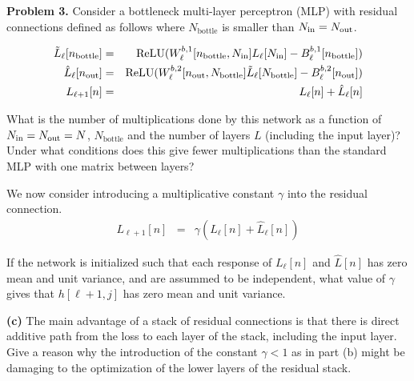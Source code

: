 \documentclass{article}
\newcommand{\solution}[1]{}
\begin{document}
\bigskip
{\bf Problem 3.} Consider a bottleneck multi-layer perceptron (MLP) with residual connections
defined as follows where $N_{\mathrm{bottle}}$ is smaller than $N_{\mathrm{in}} = N_{\mathrm{out}}$.

\begin{eqnarray*}
  \tilde{L}_\ell[n_{\mathrm{bottle}}] & = & \mathrm{ReLU}(W^{b,1}_\ell[n_{\mathrm{bottle}},N_{\mathrm{in}}]L_\ell[N_{\mathrm{in}}] - B^{b,1}_\ell[n_{\mathrm{bottle}}]) \\
  \hat{L}_\ell[n_{\mathrm{out}}] & = & \mathrm{ReLU}(W^{b,2}_\ell[n_{\mathrm{out}},N_{\mathrm{bottle}}]\tilde{L}_\ell[N_{\mathrm{bottle}}] - B^{b,2}_\ell[n_{\mathrm{out}}]) \\
  L_{\ell+1}[n] & = & L_\ell[n] + \hat{L}_\ell[n]
\end{eqnarray*}

 What is the number of multiplications done by this network as a function of $N_{\mathrm{in}}
= N_{\mathrm{out}} = N$, $N_{\mathrm{bottle}}$ and the number of layers $L$ (including the input layer)?  Under
what conditions does this give fewer multiplications than the standard MLP with one matrix between
layers?


\solution{The number of multiplications is $2NN_{\mathrm{bottle}}(L-1)$.  For a standard MLP (with
  no botleneck) the number of multiplications is $N^2(L-1)$.  The bottleneck layer has fewer
  multiplications for $N_{\mathrm{bottle}} < N/2$.}


 We now consider introducing a multiplicative constant $\gamma$ into the residual connection.
\begin{eqnarray*}
  L_{\ell+1}[n] & = & \gamma(L_\ell[n] + \hat{L}_\ell[n])
\end{eqnarray*}

If the network is initialized such that each response of $L_\ell[n]$ and $\hat{L}[n]$ has zero
mean and unit variance, and are assummed to be independent, what value of $\gamma$ gives that
$h[\ell+1,j]$ has zero mean and unit variance.

\solution{$1/\sqrt{2}$}
  
\medskip
{\bf (c)} The main advantage of a stack of residual connections is that there is direct additive
path from the loss to each layer of the stack, including the input layer.  Give a reason why the
introduction of the constant $\gamma < 1$ as in part (b) might be damaging to the optimization of
the lower layers of the residual stack.

\solution{When we introduce $\gamma < 1$ as in (b) the gradient update on the bottom layer is
  reduced by $\gamma^{L-2}$.  This could harm the learning along the direct connection between the
  loss and the first layer of the network.}
\end{document}
